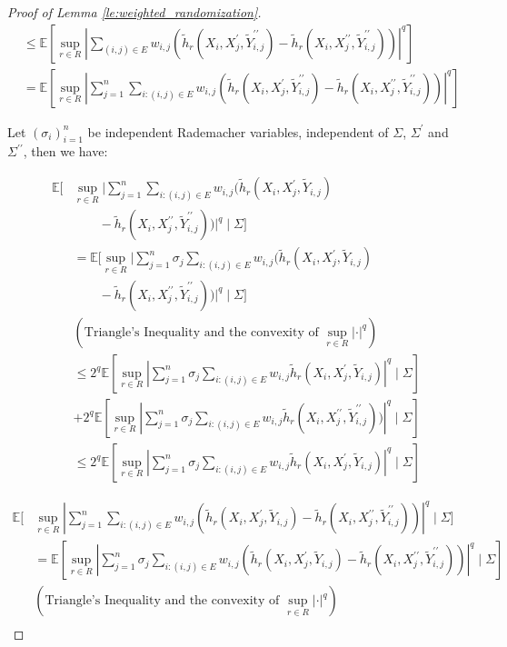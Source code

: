 \documentclass[letterpaper]{article} %
\def\DoubleColumn{}
\def\DoubleColumnEnd{}
\def\SingleColumn{}
\def\SingleColumnEnd{}
\newcommand{\E}{\mathbb{E}}
\newcommand{\pair}[1]{(#1)}
\begin{document}
\begin{proof}[Proof of Lemma \ref{le:weighted_randomization}]
\begin{align*}
    &\le \E[\sup_{r\in R}|\sum_{\pair{i,j}\in E} w_{i,j}(\tilde{h}_r(X_i,X_j^\prime,\tilde{Y}_{i,j}^{\prime\prime})-\tilde{h}_r(X_i,X_j^{\prime\prime},\tilde{Y}_{i,j}^{\prime\prime}))|^q]\\
    &= \E[\sup_{r\in R}|\sum_{j=1}^n \sum_{i:\pair{i,j}\in E} w_{i,j}(\tilde{h}_r(X_i,X_j^\prime,\tilde{Y}_{i,j}^{\prime\prime})-\tilde{h}_r(X_i,X_j^{\prime\prime},\tilde{Y}_{i,j}^{\prime\prime}))|^q]
\end{align*}
\SingleColumnEnd
Let $(\sigma_i)_{i=1}^n$ be independent Rademacher variables, independent of $\Sigma$, $\Sigma^\prime$ and $\Sigma^{\prime\prime}$, then we have:
\DoubleColumn
\begin{align*}
    \E[&\sup_{r\in R}|\sum_{j=1}^n \sum_{i:\pair{i,j}\in E} w_{i,j}(\tilde{h}_r(X_i,X_j^\prime,\tilde{Y}_{i,j})\\
    &\qquad-\tilde{h}_r(X_i,X_j^{\prime\prime},\tilde{Y}_{i,j}^{\prime\prime}))|^q\mid \Sigma]\\
    &= \E[\sup_{r\in R}|\sum_{j=1}^n \sigma_j \sum_{i:\pair{i,j}\in E} w_{i,j}(\tilde{h}_r(X_i,X_j^\prime,\tilde{Y}_{i,j})\\
    &\qquad-\tilde{h}_r(X_i,X_j^{\prime\prime},\tilde{Y}_{i,j}^{\prime\prime}))|^q\mid \Sigma]\\
    &(\text{Triangle's Inequality and the convexity of }\sup_{r\in R}|\cdot|^q)\\
    &\le 2^q\E[\sup_{r\in R}|\sum_{j=1}^n \sigma_j \sum_{i:\pair{i,j}\in E} w_{i,j}\tilde{h}_r(X_i,X_j^\prime,\tilde{Y}_{i,j})|^q\mid \Sigma]\\
    &+ 2^q\E[\sup_{r\in R}|\sum_{j=1}^n \sigma_j \sum_{i:\pair{i,j}\in E} w_{i,j}\tilde{h}_r(X_i,X_j^{\prime\prime},\tilde{Y}_{i,j}^{\prime\prime}))|^q\mid \Sigma]\\
    &\le 2^q\E[\sup_{r\in R}|\sum_{j=1}^n\sigma_j\sum_{i:\pair{i,j}\in E}w_{i,j} \tilde{h}_r(X_i,X_j^\prime,\tilde{Y}_{i,j})|^q\mid \Sigma]
\end{align*}
\DoubleColumnEnd
\SingleColumn
\begin{align*}
    \E[&\sup_{r\in R}|\sum_{j=1}^n \sum_{i:\pair{i,j}\in E} w_{i,j}(\tilde{h}_r(X_i,X_j^\prime,\tilde{Y}_{i,j})-\tilde{h}_r(X_i,X_j^{\prime\prime},\tilde{Y}_{i,j}^{\prime\prime}))|^q\mid \Sigma]\\
    &= \E[\sup_{r\in R}|\sum_{j=1}^n \sigma_j \sum_{i:\pair{i,j}\in E} w_{i,j}(\tilde{h}_r(X_i,X_j^\prime,\tilde{Y}_{i,j})-\tilde{h}_r(X_i,X_j^{\prime\prime},\tilde{Y}_{i,j}^{\prime\prime}))|^q\mid \Sigma]\\
    &(\text{Triangle's Inequality and the convexity of }\sup_{r\in R}|\cdot|^q)\\

\end{align*}
\end{proof}
\end{document}

